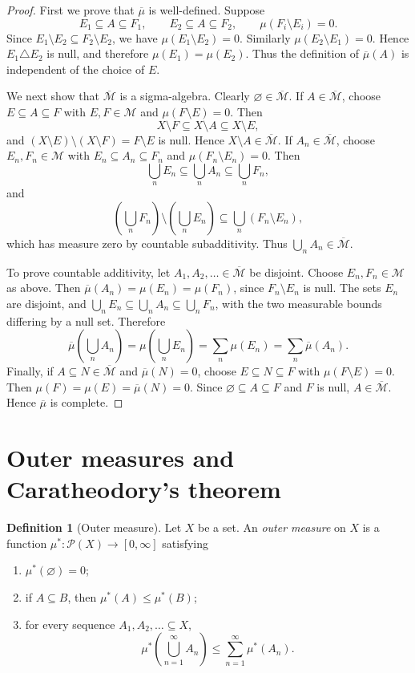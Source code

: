 \documentclass[11pt,openany]{book}
\numberwithin{equation}{chapter}
\theoremstyle{definition}
\newtheorem{definition}{Definition}[chapter]
\theoremstyle{plain}
\theoremstyle{remark}
\newcommand{\M}{\mathcal{M}}
\newcommand{\1}{\mathbf{1}}
\begin{document}
\begin{proof}
First we prove that \(\overline\mu\) is well-defined. Suppose
\[
  E_1\subseteq A\subseteq F_1,
  \qquad E_2\subseteq A\subseteq F_2,
  \qquad \mu(F_i\setminus E_i)=0.
\]
Since \(E_1\setminus E_2\subseteq F_2\setminus E_2\), we have \(\mu(E_1\setminus E_2)=0\). Similarly \(\mu(E_2\setminus E_1)=0\). Hence \(E_1\triangle E_2\) is null, and therefore \(\mu(E_1)=\mu(E_2)\). Thus the definition of \(\overline\mu(A)\) is independent of the choice of \(E\).

We next show that \(\overline{\M}\) is a sigma-algebra. Clearly \(\varnothing\in\overline{\M}\). If \(A\in\overline{\M}\), choose \(E\subseteq A\subseteq F\) with \(E,F\in\M\) and \(\mu(F\setminus E)=0\). Then
\[
  X\setminus F\subseteq X\setminus A\subseteq X\setminus E,
\]
and \((X\setminus E)\setminus(X\setminus F)=F\setminus E\) is null. Hence \(X\setminus A\in\overline{\M}\). If \(A_n\in\overline{\M}\), choose \(E_n,F_n\in\M\) with \(E_n\subseteq A_n\subseteq F_n\) and \(\mu(F_n\setminus E_n)=0\). Then
\[
  \bigcup_nE_n\subseteq \bigcup_nA_n\subseteq \bigcup_nF_n,
\]
and
\[
  \left(\bigcup_nF_n\right)\setminus\left(\bigcup_nE_n\right)
  \subseteq \bigcup_n(F_n\setminus E_n),
\]
which has measure zero by countable subadditivity. Thus \(\bigcup_nA_n\in\overline{\M}\).

To prove countable additivity, let \(A_1,A_2,\ldots\in\overline{\M}\) be disjoint. Choose \(E_n,F_n\in\M\) as above. Then \(\overline\mu(A_n)=\mu(E_n)=\mu(F_n)\), since \(F_n\setminus E_n\) is null. The sets \(E_n\) are disjoint, and \(\bigcup_nE_n\subseteq\bigcup_nA_n\subseteq\bigcup_nF_n\), with the two measurable bounds differing by a null set. Therefore
\[
  \overline\mu\left(\bigcup_nA_n\right)
  =\mu\left(\bigcup_nE_n\right)
  =\sum_n\mu(E_n)
  =\sum_n\overline\mu(A_n).
\]
Finally, if \(A\subseteq N\in\overline{\M}\) and \(\overline\mu(N)=0\), choose \(E\subseteq N\subseteq F\) with \(\mu(F\setminus E)=0\). Then \(\mu(F)=\mu(E)=\overline\mu(N)=0\). Since \(\varnothing\subseteq A\subseteq F\) and \(F\) is null, \(A\in\overline{\M}\). Hence \(\overline\mu\) is complete.
\end{proof}

\section{Outer measures and Caratheodory's theorem}

\begin{definition}[Outer measure]
Let \(X\) be a set. An \emph{outer measure} on \(X\) is a function \(\mu^*:\mathcal P(X)\to[0,\infty]\) satisfying
\begin{enumerate}[label=\textup{(\roman*)}]
  \item \(\mu^*(\varnothing)=0\);
  \item if \(A\subseteq B\), then \(\mu^*(A)\leq\mu^*(B)\);
  \item for every sequence \(A_1,A_2,\ldots\subseteq X\),
  \[
    \mu^*\left(\bigcup_{n=1}^{\infty}A_n\right)
    \leq \sum_{n=1}^{\infty}\mu^*(A_n).
  \]
\end{enumerate}
\end{definition}
\end{document}
